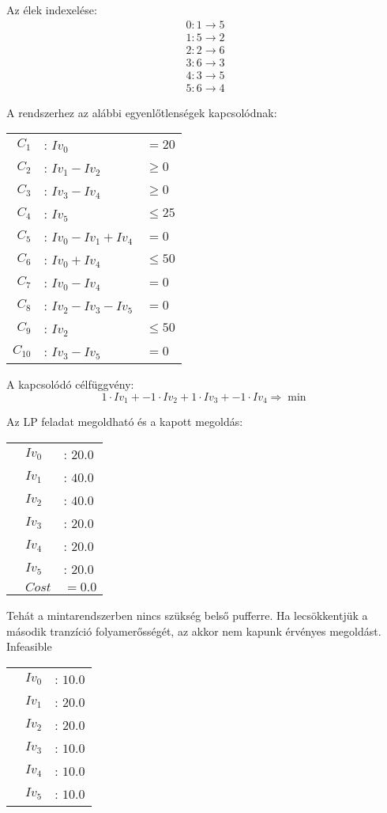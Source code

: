 Az élek indexelése:
\begin{align*}
0  :  1 \rightarrow 5  \\
1  :  5 \rightarrow 2  \\
2  :  2 \rightarrow 6  \\
3  :  6 \rightarrow 3  \\
4  :  3 \rightarrow 5  \\
5  :  6 \rightarrow 4 
\end{align*}

A rendszerhez az alábbi egyenlőtlenségek kapcsolódnak:

\begin{center}
\begin{tabular}{rll}
$C_1$ &: $Iv_0$ &$= 20$ \\
$C_2$ &: $Iv_1 - Iv_2$ &$\geq 0$\\
$C_3$ &: $Iv_3 - Iv_4$ &$\geq 0$\\
$C_4$ &: $Iv_5$ &$\leq 25$\\
$C_5$ &: $Iv_0 - Iv_1 + Iv_4$ &$= 0$\\
$C_6$ &: $Iv_0 + Iv_4 $&$\leq 50$\\
$C_7$ &: $Iv_0 - Iv_4 $&$= 0$\\
$C_8$ &: $Iv_2 - Iv_3 - Iv_5$&$= 0$\\
$C_9$ &: $Iv_2 $&$\leq 50$\\
$C_{10}$ &: $Iv_3 - Iv_5 $&$= 0$
\end{tabular}
\end{center}

A kapcsolódó célfüggvény:
$$1\cdot Iv_1 + -1\cdot Iv_2 + 1\cdot Iv_3 + -1\cdot Iv_4\Rightarrow \min$$

Az LP feladat megoldható és a kapott megoldás:
\begin{center}
\begin{tabular}{rll}
&$Iv_0$ &: $20.0$\\
&$Iv_1$ &: $40.0$\\
&$Iv_2$ &: $40.0$\\
&$Iv_3$ &: $20.0$\\
&$Iv_4$ &: $20.0$\\
&$Iv_5$ &: $20.0$\\
&$Cost$ & $= 0.0$
\end{tabular}
\end{center}
Tehát a mintarendszerben nincs szükség belső pufferre. 
Ha lecsökkentjük a második tranzíció folyamerősségét, az akkor nem kapunk érvényes megoldást. \\
Infeasible
\begin{center}
\begin{tabular}{rll}
&$Iv_0$ &: $10.0$\\
&$Iv_1$ &: $20.0$\\
&$Iv_2$ &: $20.0$\\
&$Iv_3$ &: $10.0$\\
&$Iv_4$ &: $10.0$\\
&$Iv_5$ &: $10.0$
\end{tabular}
\end{center}